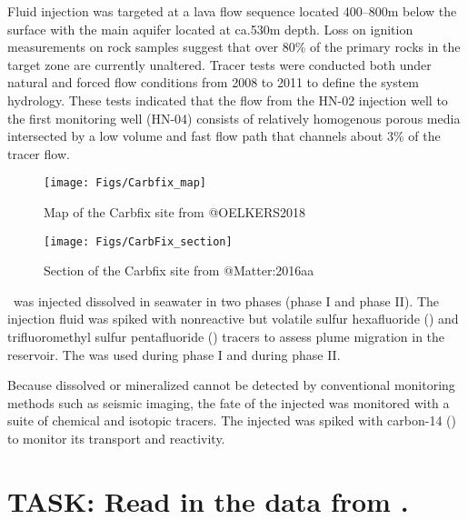 \documentclass[nofonts,x11names]{tufte-handout}
\begin{document}
Fluid injection was targeted at a lava flow sequence located 400--800m
below the surface with the main aquifer located at ca.530m depth. Loss
on ignition measurements on rock samples suggest that over 80\% of the
primary rocks in the target zone are currently unaltered. Tracer tests
were conducted both under natural and forced flow conditions from 2008
to 2011 to define the system hydrology. These tests indicated that the
flow from the HN-02 injection well to the first monitoring well (HN-04)
consists of relatively homogenous porous media intersected by a low
volume and fast flow path that channels about 3\% of the tracer flow.

\begin{figure*}

{\centering \texttt{[image: Figs/Carbfix\_map]} 

}

\caption[Map of the Carbfix site from @OELKERS2018]{Map of the Carbfix site from @OELKERS2018}\label{fig:unnamed-chunk-1}
\end{figure*}

\begin{figure*}

{\centering \texttt{[image: Figs/CarbFix\_section]} 

}

\caption[Section of the Carbfix site from @Matter:2016aa]{Section of the Carbfix site from @Matter:2016aa}\label{fig:unnamed-chunk-2}
\end{figure*}

\carb~was injected dissolved in seawater in two phases (phase I and
phase II). The injection fluid was spiked with nonreactive but volatile
sulfur hexafluoride () and trifluoromethyl sulfur pentafluoride
() tracers to assess plume migration in the reservoir. The
 was used during phase I and  during phase II.

Because dissolved or mineralized  cannot be detected by
conventional monitoring methods such as seismic imaging, the fate of the
injected  was monitored with a suite of chemical and isotopic
tracers. The injected  was spiked with carbon-14 () to
monitor its transport and reactivity.

\section{\texorpdfstring{TASK: Read in the data from
\citet{Matter:2016aa}.}{TASK: Read in the data from @Matter:2016aa.}}\label{task-read-in-the-data-from-matter2016aa.}
\end{document}
